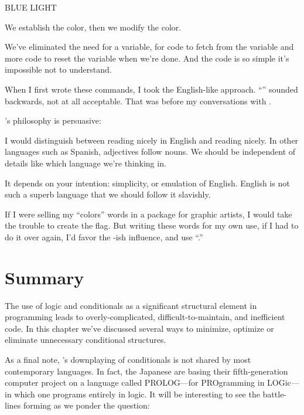 \begin{Code}
BLUE LIGHT
\end{Code}
We establish the color, then we modify the color.

We've eliminated the need for a variable, for code to fetch from the
variable and more code to reset the variable when we're done. And the
code is so simple it's impossible not to understand.

When I first wrote these commands, I took the English-like approach.
``'' sounded backwards, not at all acceptable. That was
before my conversations with
.

\begin{interview}
's philosophy is persuasive:
\begin{tfquot}
I would distinguish between reading nicely in English and reading nicely.
In other languages such as Spanish, adjectives follow nouns. We should be
independent of details like which language we're thinking in.

It depends on your intention: simplicity, or emulation of English. English
is not such a superb language that we should follow it slavishly.
\end{tfquot}
\end{interview}
If I were selling my ``colors'' words in a package for graphic artists, I
would take the trouble to create the flag. But writing these words for my
own use, if I had to do it over again, I'd favor the -ish
influence, and use ``.''%
%
%
%

\section{Summary}

The use of logic and conditionals as a significant structural element in
programming leads to overly-complicated, difficult-to-maintain, and
inefficient code. In this chapter we've discussed several ways to minimize,
optimize or eliminate unnecessary conditional structures.

As a final note, \Forth{}'s downplaying of conditionals is not shared
by most contemporary languages. In fact, the Japanese are basing their
fifth-generation computer project on a language called PROLOG---for
PROgramming in LOGic---in which one programs entirely in logic. It will
be interesting to see the battle-lines forming as we ponder the question:


